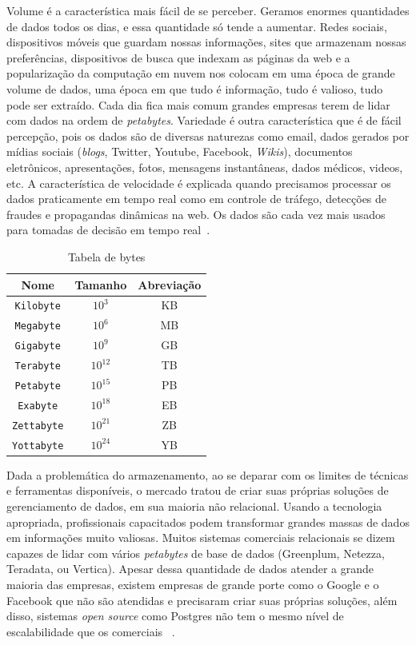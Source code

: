 Volume é a característica mais fácil de se perceber. Geramos enormes quantidades de dados todos os dias, e essa quantidade só tende a aumentar. Redes sociais, dispositivos móveis que guardam nossas informações, sites que armazenam nossas preferências, dispositivos de busca que indexam as páginas da web e a popularização da computação em nuvem nos colocam em uma época de grande volume de dados, uma época em que tudo é informação, tudo é valioso, tudo pode ser extraído. Cada dia fica mais comum grandes empresas terem de lidar com dados na ordem de \textit{petabytes}. Variedade é outra característica que é de fácil percepção, pois os dados são de diversas naturezas como email, dados gerados por mídias sociais (\textit{blogs}, Twitter, Youtube, Facebook, \textit{Wikis}), documentos eletrônicos, apresentações, fotos, mensagens instantâneas, dados médicos, videos, etc. A característica de velocidade é explicada quando precisamos processar os dados praticamente em tempo real como em controle de tráfego, detecções de fraudes e propagandas dinâmicas na web. Os dados são cada vez mais usados para tomadas de decisão em tempo real~\cite{promiseperil}.

\begin{table}
	\caption{Tabela de bytes}
	\begin{center}
	\begin{tabular}{ccc}
		\hline
			\textbf{Nome} & \textbf{Tamanho} & \textbf{Abreviação} \\
		\hline
			\texttt{Kilobyte}	& $10^3$ & KB \\
			\texttt{Megabyte}	& $10^6$ & MB \\
			\texttt{Gigabyte}	& $10^9$ & GB \\
			\texttt{Terabyte}	& $10^{12}$ & TB \\
			\texttt{Petabyte}	& $10^{15}$ & PB \\
			\texttt{Exabyte}	& $10^{18}$ & EB \\
			\texttt{Zettabyte}	& $10^{21}$ & ZB \\
			\texttt{Yottabyte}	& $10^{24}$ & YB \\
		\hline
	\end {tabular}
	\end{center}
	\label{tab:bytes}
\end{table}

Dada a problemática do armazenamento, ao se deparar com os limites de técnicas e ferramentas disponíveis, o mercado tratou de criar suas próprias soluções de gerenciamento de dados, em sua maioria não relacional. Usando a tecnologia apropriada, profissionais capacitados podem transformar grandes massas de dados em informações muito valiosas. Muitos sistemas comerciais relacionais se dizem capazes de lidar com vários \textit{petabytes} de base de dados (Greenplum, Netezza, Teradata, ou Vertica). Apesar dessa quantidade de dados atender a grande maioria das empresas, existem empresas de grande porte como o Google e o Facebook que não são atendidas e precisaram criar suas próprias soluções, além disso, sistemas \textit{open source} como Postgres  não tem o mesmo nível de escalabilidade que os comerciais ~\cite{fromdbtobigdata}.


